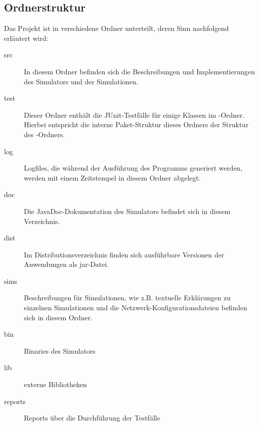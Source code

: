 \subsection{Ordnerstruktur}
Das Projekt ist in verschiedene Ordner unterteilt, deren Sinn nachfolgend erläutert wird:
\begin{description}
	\item[src] In diesem Ordner befinden sich die Beschreibungen und Implementierungen des Simulators und der Simulationen.
	\item[test] Dieser Ordner enthält die JUnit-Testfälle für einige Klassen im -Ordner. Hierbei entspricht die interne Paket-Struktur dieses Ordners der Struktur des -Ordners.
	\item[log] Logfiles, die während der Ausführung des Programms generiert werden, werden mit einem Zeitstempel in diesem Ordner abgelegt.
	\item[doc] Die JavaDoc-Dokumentation des Simulators befindet sich in diesem Verzeichnis.
	\item[dist] Im Distributionsverzeichnis finden sich ausführbare Versionen der Anwendungen als jar-Datei.
	\item[sims] Beschreibungen für Simulationen, wie z.B. textuelle Erklärungen zu einzelnen Simulationen und die Netzwerk-Konfigurationsdateien befinden sich in diesem Ordner.
	\item[bin] Binaries des Simulators
	\item[lib] externe Bibliotheken
	\item[reports] Reports über die Durchführung der Testfälle
\end{description}
